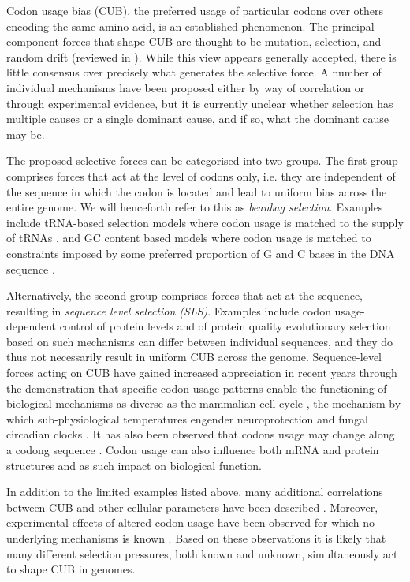 \documentclass[a4paper,10pt]{paper}%
\begin{document}
Codon usage bias (CUB), the preferred usage of particular codons over others encoding the same amino acid, is an established phenomenon. The principal component forces that shape CUB are thought to be mutation, selection, and random drift (reviewed in \cite{fantomas7}). While this view appears generally accepted, there is little consensus over precisely what generates the selective force. A number of individual mechanisms have been proposed either by way of correlation or through experimental evidence, but it is currently unclear whether selection has multiple causes or a single dominant cause, and if so, what the dominant cause may be. 
\par
The proposed selective forces can be categorised into two groups. The first group comprises forces that act at the level of codons only, i.e. they are independent of the sequence in which the codon is located and lead to uniform bias across the entire genome. We will henceforth refer to this as  {\em beanbag selection}.  Examples include tRNA-based selection models where codon usage is matched to the supply of tRNAs \cite{iki}, and GC content based models where codon usage is matched to constraints imposed by some preferred proportion of G and C bases in the DNA sequence \cite{fantomas8,fantomas1,fantomas2}. 
\par
Alternatively, the second group comprises forces that act at the sequence, resulting in {\em sequence level selection (SLS)}. Examples include codon usage-dependent control of protein levels \cite{myembopaper}  and of protein quality  \cite{fantomas9,pff}  evolutionary selection based on such mechanisms can differ between individual sequences, and they do thus not necessarily result in uniform CUB across the genome. Sequence-level forces acting on CUB have gained increased appreciation in recent years through the demonstration that specific codon usage patterns enable the functioning of biological mechanisms as diverse as the mammalian cell cycle \cite{fantomas10}, the mechanism by which sub-physiological temperatures engender neuroprotection \cite{fantomas11} and fungal circadian clocks \cite{23417067}.  It has also been observed that codons usage may change along a codong sequence  \cite{fantomas4,ramppaper}. Codon usage can also influence both mRNA \cite{fantomas5} and protein structures \cite{fantomas6,relcodon}  and as such impact on biological function. 
\par
In addition to the limited examples listed above, many additional correlations between CUB and other cellular parameters have been described \cite{fantomas7,29018283}. Moreover, experimental effects of altered codon usage have been observed for which no underlying mechanisms is known \cite{tobiasandlynnepaper}. Based on these observations it is likely that many different selection pressures, both known and unknown, simultaneously act to shape CUB in genomes. 
\end{document}
